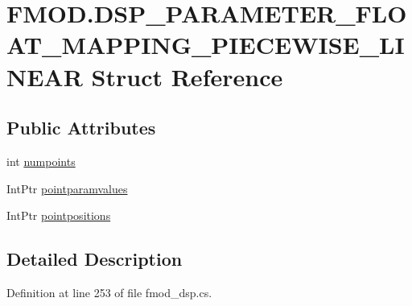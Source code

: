 \hypertarget{struct_f_m_o_d_1_1_d_s_p___p_a_r_a_m_e_t_e_r___f_l_o_a_t___m_a_p_p_i_n_g___p_i_e_c_e_w_i_s_e___l_i_n_e_a_r}{}\section{F\+M\+O\+D.\+D\+S\+P\+\_\+\+P\+A\+R\+A\+M\+E\+T\+E\+R\+\_\+\+F\+L\+O\+A\+T\+\_\+\+M\+A\+P\+P\+I\+N\+G\+\_\+\+P\+I\+E\+C\+E\+W\+I\+S\+E\+\_\+\+L\+I\+N\+E\+AR Struct Reference}
\label{struct_f_m_o_d_1_1_d_s_p___p_a_r_a_m_e_t_e_r___f_l_o_a_t___m_a_p_p_i_n_g___p_i_e_c_e_w_i_s_e___l_i_n_e_a_r}
\subsection*{Public Attributes}
\begin{DoxyCompactItemize}
\item 
int \hyperlink{struct_f_m_o_d_1_1_d_s_p___p_a_r_a_m_e_t_e_r___f_l_o_a_t___m_a_p_p_i_n_g___p_i_e_c_e_w_i_s_e___l_i_n_e_a_r_a004801802907d5760757e80fb0cc64e8}{numpoints}
\item 
Int\+Ptr \hyperlink{struct_f_m_o_d_1_1_d_s_p___p_a_r_a_m_e_t_e_r___f_l_o_a_t___m_a_p_p_i_n_g___p_i_e_c_e_w_i_s_e___l_i_n_e_a_r_a9491f5eb024387d14c970b279fabc7c7}{pointparamvalues}
\item 
Int\+Ptr \hyperlink{struct_f_m_o_d_1_1_d_s_p___p_a_r_a_m_e_t_e_r___f_l_o_a_t___m_a_p_p_i_n_g___p_i_e_c_e_w_i_s_e___l_i_n_e_a_r_a242660833d9883f786deaf6b0bb01b4f}{pointpositions}
\end{DoxyCompactItemize}


\subsection{Detailed Description}


Definition at line 253 of file fmod\+\_\+dsp.\+cs.




